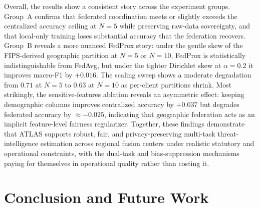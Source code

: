 \documentclass[conference]{IEEEtran}
\begin{document}
Overall, the results show a consistent story across the experiment groups. Group~A confirms that federated coordination meets or slightly exceeds the centralized accuracy ceiling at $N=5$ while preserving raw-data sovereignty, and that local-only training loses substantial accuracy that the federation recovers. Group~B reveals a more nuanced FedProx story: under the gentle skew of the FIPS-derived geographic partition at $N=5$ or $N=10$, FedProx is statistically indistinguishable from FedAvg, but under the tighter Dirichlet skew at $\alpha = 0.2$ it improves macro-F1 by $+0.016$. The scaling sweep shows a moderate degradation from $0.71$ at $N=5$ to $0.63$ at $N=10$ as per-client partitions shrink. Most strikingly, the sensitive-features ablation reveals an asymmetric effect: keeping demographic columns improves centralized accuracy by $+0.037$ but degrades federated accuracy by $\approx -0.025$, indicating that geographic federation acts as an implicit feature-level fairness regularizer. Together, these findings demonstrate that ATLAS supports robust, fair, and privacy-preserving multi-task threat-intelligence estimation across regional fusion centers under realistic statutory and operational constraints, with the dual-task and bias-suppression mechanisms paying for themselves in operational quality rather than costing it.

\section{Conclusion and Future Work}
\label{sec:conclusion}
\end{document}
